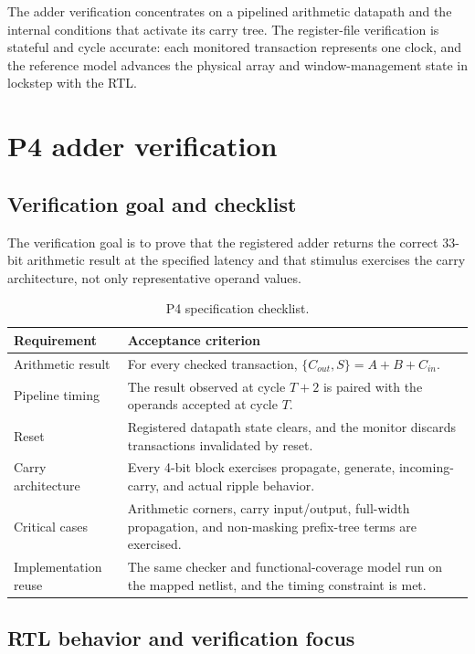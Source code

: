 \documentclass[11pt,a4paper]{article}
\begin{document}
The adder verification concentrates on a pipelined arithmetic datapath and the internal conditions that activate its carry tree. The register-file verification is stateful and cycle accurate: each monitored transaction represents one clock, and the reference model advances the physical array and window-management state in lockstep with the RTL.

\clearpage
\section{P4 adder verification}

\subsection{Verification goal and checklist}

The verification goal is to prove that the registered adder returns the correct 33-bit arithmetic result at the specified latency and that stimulus exercises the carry architecture, not only representative operand values.

\begin{table}[H]
\centering
\caption{P4 specification checklist.}
\begin{tabularx}{0.96\textwidth}{@{}p{}Y@{}}
\toprule
\textbf{Requirement} & \textbf{Acceptance criterion} \\
\midrule
Arithmetic result & For every checked transaction, \(\{C_{out},S\}=A+B+C_{in}\). \\
Pipeline timing & The result observed at cycle \(T+2\) is paired with the operands accepted at cycle \(T\). \\
Reset & Registered datapath state clears, and the monitor discards transactions invalidated by reset. \\
Carry architecture & Every 4-bit block exercises propagate, generate, incoming-carry, and actual ripple behavior. \\
Critical cases & Arithmetic corners, carry input/output, full-width propagation, and non-masking prefix-tree terms are exercised. \\
Implementation reuse & The same checker and functional-coverage model run on the mapped netlist, and the timing constraint is met. \\
\bottomrule
\end{tabularx}
\end{table}

\subsection{RTL behavior and verification focus}
\end{document}
